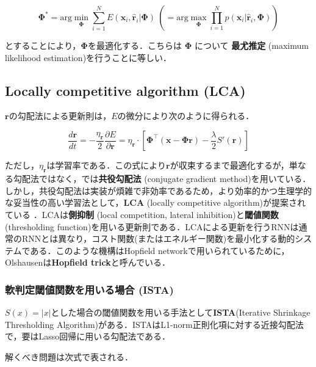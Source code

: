\begin{equation}
\mathbf{\Phi}^*=\text{arg}\min_{\mathbf{\Phi}} \sum_{i=1}^N E(\mathbf{x}_i, \hat{\mathbf{r}}_i|\mathbf{\Phi})\ \left(= \text{arg}\max_{\mathbf{\Phi}} \prod_{i=1}^N p(\mathbf{x}_i|\hat{\mathbf{r}}_i, \mathbf{\Phi})\right)
\end{equation}


とすることにより，$\mathbf{\Phi}$を最適化する．こちらは $\mathbf{\Phi}$ について \textbf{最尤推定} (maximum likelihood estimation)を行うことに等しい．
\subsection{ Locally competitive algorithm (LCA) }
$\mathbf{r}$の勾配法による更新則は，$E$の微分により次のように得られる．


\begin{equation}
\frac{d \mathbf{r}}{dt}= -\frac{\eta_\mathbf{r}}{2}\frac{\partial E}{\partial \mathbf{r}}=\eta_\mathbf{r} \cdot\left[\mathbf{\Phi}^\top (\mathbf{x}-\mathbf{\Phi}\mathbf{r})- \frac{\lambda}{2}S'\left(\mathbf{r}\right)\right]
\end{equation}


ただし，$\eta_{\mathbf{r}}$は学習率である．この式により$\mathbf{r}$が収束するまで最適化するが，単なる勾配法ではなく，\citep{Olshausen1996-xe}では\textbf{共役勾配法} (conjugate gradient method)を用いている．しかし，共役勾配法は実装が煩雑で非効率であるため，より効率的かつ生理学的な妥当性の高い学習法として，\textbf{LCA}  (locally competitive algorithm)が提案されている \citep{Rozell2008-wp}．LCAは\textbf{側抑制} (local competition, lateral inhibition)と\textbf{閾値関数} (thresholding function)を用いる更新則である．LCAによる更新を行うRNNは通常のRNNとは異なり，コスト関数(またはエネルギー関数)を最小化する動的システムである．このような機構はHopfield networkで用いられているために，Olshausenは\textbf{Hopfield trick}と呼んでいる．
\subsubsection{軟判定閾値関数を用いる場合 (ISTA)}
$S(x)=|x|$とした場合の閾値関数を用いる手法として\textbf{ISTA}(Iterative Shrinkage Thresholding Algorithm)がある．ISTAはL1-norm正則化項に対する近接勾配法で，要はLasso回帰に用いる勾配法である．

解くべき問題は次式で表される．


